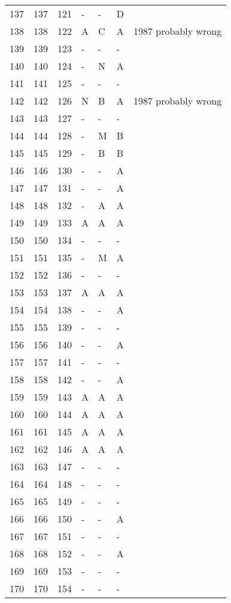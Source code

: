 \begin{longtable}{rrrllll}
  137 & 137 & 121 & - & - & D &  \\ 
  138 & 138 & 122 & A & C & A & 1987 probably wrong \\ 
  139 & 139 & 123 & - & - & - &  \\ 
  140 & 140 & 124 & - & N & A &  \\ 
  141 & 141 & 125 & - & - & - &  \\ 
  142 & 142 & 126 & N & B & A & 1987 probably wrong \\ 
  143 & 143 & 127 & - & - & - &  \\ 
  144 & 144 & 128 & - & M & B &  \\ 
  145 & 145 & 129 & - & B & B &  \\ 
  146 & 146 & 130 & - & - & A &  \\ 
  147 & 147 & 131 & - & - & A &  \\ 
  148 & 148 & 132 & - & A & A &  \\ 
  149 & 149 & 133 & A & A & A &  \\ 
  150 & 150 & 134 & - & - & - &  \\ 
  151 & 151 & 135 & - & M & A &  \\ 
  152 & 152 & 136 & - & - & - &  \\ 
  153 & 153 & 137 & A & A & A &  \\ 
  154 & 154 & 138 & - & - & A &  \\ 
  155 & 155 & 139 & - & - & - &  \\ 
  156 & 156 & 140 & - & - & A &  \\ 
  157 & 157 & 141 & - & - & - &  \\ 
  158 & 158 & 142 & - & - & A &  \\ 
  159 & 159 & 143 & A & A & A &  \\ 
  160 & 160 & 144 & A & A & A &  \\ 
  161 & 161 & 145 & A & A & A &  \\ 
  162 & 162 & 146 & A & A & A &  \\ 
  163 & 163 & 147 & - & - & - &  \\ 
  164 & 164 & 148 & - & - & - &  \\ 
  165 & 165 & 149 & - & - & - &  \\ 
  166 & 166 & 150 & - & - & A &  \\ 
  167 & 167 & 151 & - & - & - &  \\ 
  168 & 168 & 152 & - & - & A &  \\ 
  169 & 169 & 153 & - & - & - &  \\ 
  170 & 170 & 154 & - & - & - &  \\ 

\end{longtable}
